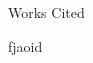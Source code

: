 \documentclass[12pt]{article}
\newcommand{\bibent}{\noindent \hangindent 40pt}
\newenvironment{workscited}{\newpage \begin{center} Works Cited \end{center}}{\newpage }
\begin{document}
\begin{flushleft}
\begin{spacing}{2.0}
\begin{workscited}

\bibent fjaoid	
\end{workscited}



\end{spacing}
\end{flushleft}
\end{document}
